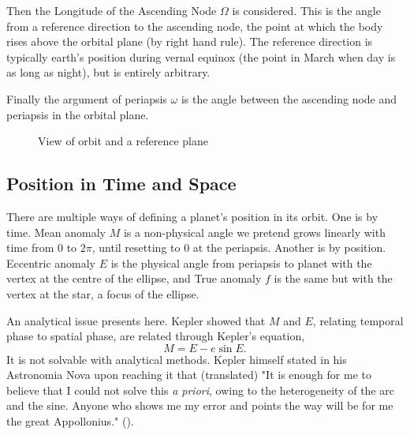 Then the Longitude of the Ascending Node $\Omega$ is considered. This is the angle from a reference direction to the ascending node, the point at which the body rises above the orbital plane (by right hand rule). The reference direction is typically earth's position during vernal equinox (the point in March when day is as long as night), but is entirely arbitrary.

Finally the argument of periapsis $\omega$ is the angle between the ascending node and periapsis in the orbital plane.

\begin{figure}[h]
    \centering
    \caption{View of orbit and a reference plane}
    \label{fig:enter-label}
\end{figure}

\subsection{Position in Time and Space}
There are multiple ways of defining a planet's position in its orbit. One is by time. Mean anomaly $M$ is a non-physical angle we pretend grows linearly with time from $0$ to $2\pi$, until resetting to $0$ at the periapsis. Another is by position. Eccentric anomaly $E$ is the physical angle from periapsis to planet with the vertex at the centre of the ellipse, and True anomaly $f$ is the same but with the vertex at the star, a focus of the ellipse.

An analytical issue presents here. Kepler showed that $M$ and  $E$, relating temporal phase to spatial phase, are related through Kepler's equation,
\[
    M = E - e \sin E.
\]
It is not solvable with analytical methods. Kepler himself stated in his Astronomia Nova upon reaching it that (translated) "It is enough for me to believe that I could not solve this \textit{a priori}, owing to the heterogeneity of the arc and the sine. Anyone who shows me my error and points the way will be for me the great Appollonius." (\cite[p.~450]{Kepler_1609}).
